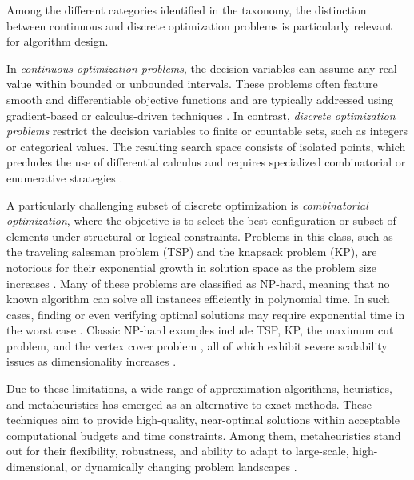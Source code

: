 Among the different categories identified in the taxonomy, the distinction between continuous and discrete optimization problems is particularly relevant for algorithm design.

In \textit{continuous optimization problems}, the decision variables can assume any real value within bounded or unbounded intervals. These problems often feature smooth and differentiable objective functions and are typically addressed using gradient-based or calculus-driven techniques \parencite{chen2009novel, stein2004continuous}. In contrast, \textit{discrete optimization problems} restrict the decision variables to finite or countable sets, such as integers or categorical values. The resulting search space consists of isolated points, which precludes the use of differential calculus and requires specialized combinatorial or enumerative strategies \parencite{bartz2017model, shen2018fractional}.

A particularly challenging subset of discrete optimization is \textit{combinatorial optimization}, where the objective is to select the best configuration or subset of elements under structural or logical constraints. Problems in this class, such as the traveling salesman problem (TSP) and the knapsack problem (KP), are notorious for their exponential growth in solution space as the problem size increases \parencite{santucci2020algebraic, zhao2024neural, fatih2006particle}. Many of these problems are classified as NP-hard, meaning that no known algorithm can solve all instances efficiently in polynomial time. In such cases, finding or even verifying optimal solutions may require exponential time in the worst case \parencite{ahmed2021probabilistic, buchheim2018robust}. Classic NP-hard examples include TSP, KP, the maximum cut problem, and the vertex cover problem \parencite{schuetz2022combinatorial, chatterjee2024solving}, all of which exhibit severe scalability issues as dimensionality increases \parencite{honari2022combinatorial, dutta2021ising}.

Due to these limitations, a wide range of approximation algorithms, heuristics, and metaheuristics has emerged as an alternative to exact methods. These techniques aim to provide high-quality, near-optimal solutions within acceptable computational budgets and time constraints. Among them, metaheuristics stand out for their flexibility, robustness, and ability to adapt to large-scale, high-dimensional, or dynamically changing problem landscapes \parencite{wang2021deep, chatterjee2024solving}.

